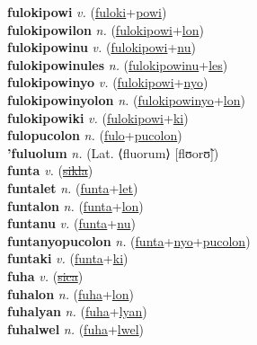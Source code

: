 \textbf{fulokipowi} \textit{v.} (\hyperref[fuloki]{fuloki}+\hyperref[powi]{powi})
 \label{fulokipowi} \\
\textbf{fulokipowilon} \textit{n.} (\hyperref[fulokipowi]{fulokipowi}+\hyperref[lon]{lon})
 \label{fulokipowilon} \\
\textbf{fulokipowinu} \textit{v.} (\hyperref[fulokipowi]{fulokipowi}+\hyperref[nu]{nu})
 \label{fulokipowinu} \\
\textbf{fulokipowinules} \textit{n.} (\hyperref[fulokipowinu]{fulokipowinu}+\hyperref[les]{les})
 \label{fulokipowinules} \\
\textbf{fulokipowinyo} \textit{v.} (\hyperref[fulokipowi]{fulokipowi}+\hyperref[nyo]{nyo})
 \label{fulokipowinyo} \\
\textbf{fulokipowinyolon} \textit{n.} (\hyperref[fulokipowinyo]{fulokipowinyo}+\hyperref[lon]{lon})
 \label{fulokipowinyolon} \\
\textbf{fulokipowiki} \textit{v.} (\hyperref[fulokipowi]{fulokipowi}+\hyperref[ki]{ki})
 \label{fulokipowiki} \\
\textbf{fulopucolon} \textit{n.} (\hyperref[fulo]{fulo}+\hyperref[pucolon]{pucolon})
 \label{fulopucolon} \\
\textbf{'fuluolum} \textit{n.} (Lat. ⟨fluorum⟩ [flʊorʊ̃])
 \label{'fuluolum} \\
\textbf{funta} \textit{v.} (\hyperref[sikla]{\sout{sikla}})
 \label{funta} \\
\textbf{funtalet} \textit{n.} (\hyperref[funta]{funta}+\hyperref[let]{let})
 \label{funtalet} \\
\textbf{funtalon} \textit{n.} (\hyperref[funta]{funta}+\hyperref[lon]{lon})
 \label{funtalon} \\
\textbf{funtanu} \textit{v.} (\hyperref[funta]{funta}+\hyperref[nu]{nu})
 \label{funtanu} \\
\textbf{funtanyopucolon} \textit{n.} (\hyperref[funta]{funta}+\hyperref[nyo]{nyo}+\hyperref[pucolon]{pucolon})
 \label{funtanyopucolon} \\
\textbf{funtaki} \textit{v.} (\hyperref[funta]{funta}+\hyperref[ki]{ki})
 \label{funtaki} \\
\textbf{fuha} \textit{v.} (\hyperref[sica]{\sout{sica}})
 \label{fuha} \\
\textbf{fuhalon} \textit{n.} (\hyperref[fuha]{fuha}+\hyperref[lon]{lon})
 \label{fuhalon} \\
\textbf{fuhalyan} \textit{n.} (\hyperref[fuha]{fuha}+\hyperref[lyan]{lyan})
 \label{fuhalyan} \\
\textbf{fuhalwel} \textit{n.} (\hyperref[fuha]{fuha}+\hyperref[lwel]{lwel})
